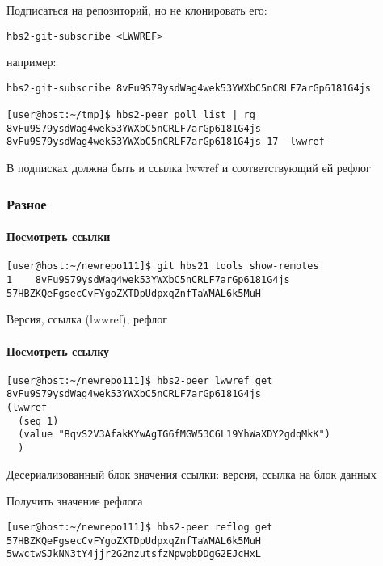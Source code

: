 \documentclass[11pt,a4paper]{article}
\begin{document}
Подписаться на репозиторий, но не клонировать его:

\begin{verbatim}
hbs2-git-subscribe <LWWREF>
\end{verbatim}

например:

\begin{verbatim}
hbs2-git-subscribe 8vFu9S79ysdWag4wek53YWXbC5nCRLF7arGp6181G4js

[user@host:~/tmp]$ hbs2-peer poll list | rg  8vFu9S79ysdWag4wek53YWXbC5nCRLF7arGp6181G4js
8vFu9S79ysdWag4wek53YWXbC5nCRLF7arGp6181G4js 17  lwwref
\end{verbatim}

В подписках должна быть и ссылка lwwref и соответствующий ей рефлог

\subsubsection{Разное}

\paragraph{Посмотреть ссылки}

\begin{verbatim}
[user@host:~/newrepo111]$ git hbs21 tools show-remotes
1    8vFu9S79ysdWag4wek53YWXbC5nCRLF7arGp6181G4js 57HBZKQeFgsecCvFYgoZXTDpUdpxqZnfTaWMAL6k5MuH
\end{verbatim}

Версия, ссылка (lwwref), рефлог

\paragraph{Посмотреть ссылку}

\begin{verbatim}
[user@host:~/newrepo111]$ hbs2-peer lwwref get 8vFu9S79ysdWag4wek53YWXbC5nCRLF7arGp6181G4js
(lwwref
  (seq 1)
  (value "BqvS2V3AfakKYwAgTG6fMGW53C6L19YhWaXDY2gdqMkK")
  )
\end{verbatim}

Десериализованный блок значения ссылки: версия, ссылка на блок данных

Получить значение рефлога
\begin{verbatim}
[user@host:~/newrepo111]$ hbs2-peer reflog get 57HBZKQeFgsecCvFYgoZXTDpUdpxqZnfTaWMAL6k5MuH
5wwctwSJkNN3tY4jjr2G2nzutsfzNpwpbDDgG2EJcHxL
\end{verbatim}
\end{document}
